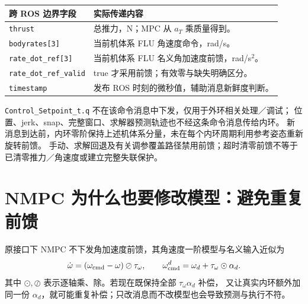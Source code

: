 \documentclass[UTF8,a4paper,11pt,fontset=fandol]{ctexart}
\newcommand{\code}[1]{{\small\nolinkurl{#1}}}
\begin{document}
\begin{table}[h!]
\centering\small
\begin{tabularx}{\linewidth}{L{4.2cm}Y}
\toprule
跨 ROS 边界字段 & 实际传递内容 \\\midrule
\code{thrust} & 总推力，N；MPC 从 $a_T$ 乘质量得到。\\
\code{bodyrates[3]} & 当前机体系 FLU 角速度命令，rad/s。\\
\code{rate_dot_ref[3]} & 当前机体系 FLU 名义角加速度前馈，rad/s$^2$。\\
\code{rate_dot_ref_valid} & true 才采用前馈；有效零与缺失明确区分。\\
\code{timestamp} & 发布 ROS 时刻的微秒值，辅助消息新鲜度判断。\\
\bottomrule
\end{tabularx}
\end{table}

\code{Control_Setpoint_t.q} 不在该命令消息中下发，仅用于外环相关处理／调试；
位置、jerk、snap、完整窗口、求解器预测轨迹也不经这条命令消息传给内环。
新消息到达前，内环零阶保持上述机体系分量，未在每个内环周期利用参考姿态重新旋转前馈。
手动、求解回退及有关调参覆盖路径禁用前馈；超时清零前馈不等于已清零推力／角速度或建立完整失联保护。
\clearpage

\section{NMPC 为什么也要修改模型：避免重复前馈}
\label{sec:nmpc}
原接口下 NMPC 不下发角加速度前馈，其角速度一阶模型与名义输入近似为
\begin{equation}
 \dot\omega=(\omega_{\rm cmd}-\omega)\oslash\tau_\omega,
 \qquad \omega_{\rm cmd}^d=\omega_d+\tau_\omega\odot\alpha_d.
\end{equation}
其中 $\odot,\oslash$ 表示逐轴乘、除。若现在既保持全部 $\tau_\omega\alpha_d$ 补偿，
又让真实内环额外加同一份 $\alpha_d$，就可能重复补偿；只改消息而不改模型也会导致预测与执行不符。
\end{document}
